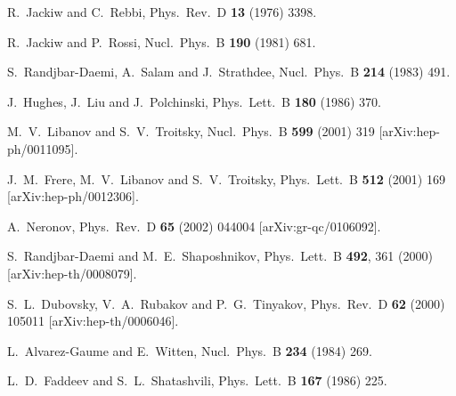 \documentclass[a4paper,12pt]{article}
\begin{document}
\begin{thebibliography}{99}
R.~Jackiw and C.~Rebbi,
Phys.\ Rev.\ D {\bf 13} (1976) 3398.

R.~Jackiw and P.~Rossi,
Nucl.\ Phys.\ B {\bf 190} (1981) 681.

S.~Randjbar-Daemi, A.~Salam and J.~Strathdee,
Nucl.\ Phys.\ B {\bf 214} (1983) 491.

J.~Hughes, J.~Liu and J.~Polchinski,
Phys.\ Lett.\ B {\bf 180} (1986) 370.

M.~V.~Libanov and S.~V.~Troitsky,
Nucl.\ Phys.\ B {\bf 599} (2001) 319
[arXiv:hep-ph/0011095].

J.~M.~Frere, M.~V.~Libanov and S.~V.~Troitsky,
Phys.\ Lett.\ B {\bf 512} (2001) 169
[arXiv:hep-ph/0012306].

A.~Neronov,
Phys.\ Rev.\ D {\bf 65} (2002) 044004
[arXiv:gr-qc/0106092].

S.~Randjbar-Daemi and M.~E.~Shaposhnikov,
Phys.\ Lett.\ B {\bf 492}, 361 (2000)
[arXiv:hep-th/0008079].

S.~L.~Dubovsky, V.~A.~Rubakov and P.~G.~Tinyakov,
Phys.\ Rev.\ D {\bf 62} (2000) 105011
[arXiv:hep-th/0006046].

L.~Alvarez-Gaume and E.~Witten,
Nucl.\ Phys.\ B {\bf 234} (1984) 269.

L.~D.~Faddeev and S.~L.~Shatashvili,
Phys.\ Lett.\ B {\bf 167} (1986) 225.


\end{thebibliography}
\end{document}
